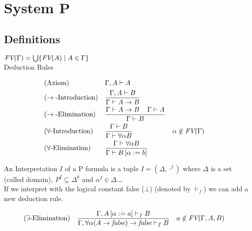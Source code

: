 \section{System P}
\subsection{Definitions}
$\emph{FV}(\Gamma)=\bigcup\{\emph{FV}(A)\mid A\in \Gamma\}$\\
Deduction Rules
\begin{mdframed}
\begingroup
\addtolength{\jot}{0.3cm}
\begin{align*}
&(\text{Axiom}) &&\Gamma,A\vdash A\\
&(\rightarrow\text{-Introduction}) &&\frac{\Gamma,A\vdash B}{\Gamma\vdash A\to B}\\
&(\rightarrow\text{-Elimination}) &&\frac{\Gamma\vdash A\to B \hspace{0.4cm}\Gamma\vdash A}{\Gamma\vdash B}\\
&(\forall\text{-Introduction}) &&\frac{\Gamma\vdash B}{\Gamma\vdash \forall\alpha B} &&\alpha\notin\emph{FV}(\Gamma) \\
&(\forall\text{-Elimination}) &&\frac{\Gamma\vdash \forall\alpha B }{\Gamma\vdash B\left[ \alpha:=b\right] } %
\end{align*}
\endgroup
\end{mdframed}
An Interpretation $I$ of a P formula is a tuple $I=(\Delta,\cdot^I)$ where $\Delta$ is a set (called domain), $P^I\subseteq\Delta^k$ and $\alpha^I\in\Delta$.\dots\\
If we interpret \false{} with the logical constant false ($\bot$) (denoted by $\vdash_f$) we can add a new deduction rule.
\begin{mdframed}
\begin{align*}
&(\exists\text{-Elimination}) &&\frac
{\Gamma,A\left[\alpha:=a\right]\vdash_f B}
{\Gamma,\forall\alpha(A\to\emph{false})\to\emph{false}\vdash_f B} && a\notin\emph{FV}(\Gamma,A,B)
\end{align*}
\end{mdframed}
